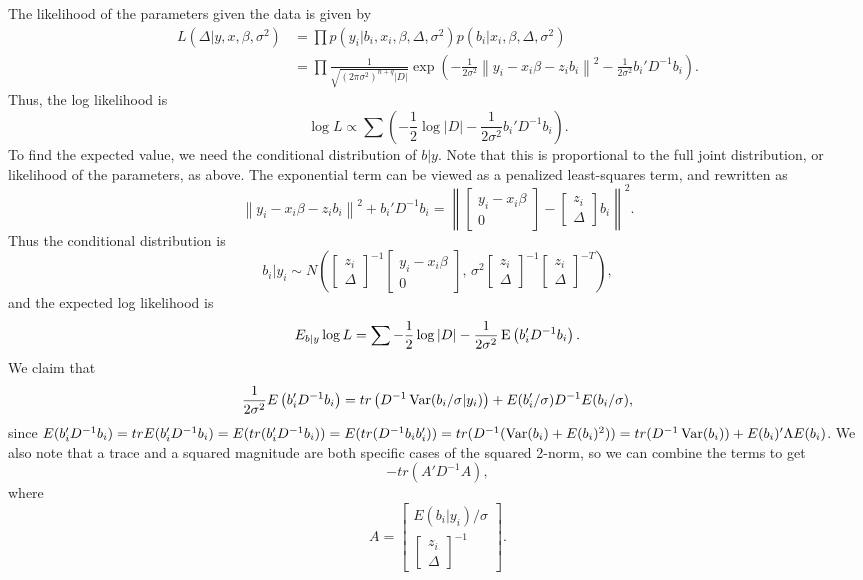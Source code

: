 \documentclass[12pt,twoside]{article}
\begin{document}
The likelihood of the parameters given the data is given by \begin{align*}
  L(\Delta| y, x, \beta, \sigma^2) &= \prod p(y_i | b_i, x_i, \beta, \Delta, \sigma^2) p(b_i | x_i, \beta, \Delta, \sigma^2) \\
  &= \prod \frac{1}{\sqrt{(2\pi \sigma^2)^{n+q} |D|}} \exp\left( -\frac{1}{2\sigma^2}\left\lVert y_i - x_i\beta - z_ib_i \right\rVert^2 -\frac{1}{2\sigma^2}b_i'D^{-1}b_i\right).
\end{align*} Thus, the log likelihood is \[
  \log L \propto \sum\left(-\frac{1}{2}\log |D| - \frac{1}{2\sigma^2}b_i'D^{-1}b_i\right).
\] To find the expected value, we need the conditional distribution of \(b | y\). Note that this is proportional to the full joint distribution, or likelihood of the parameters, as above. The exponential term can be viewed as a penalized least-squares term, and rewritten as \[
  \left\lVert y_i - x_i\beta - z_ib_i \right\rVert^2 + b_i'D^{-1}b_i = \left\lVert \begin{bmatrix} y_i - x_i\beta \\ 0 \end{bmatrix} - \begin{bmatrix} z_i \\ \Delta \end{bmatrix}b_i \right\rVert^2.
\] Thus the conditional distribution is \[
  b_i | y_i \sim N\left(\begin{bmatrix}z_i \\ \Delta \end{bmatrix}^{-1}\begin{bmatrix}y_i - x_i\beta \\ 0 \end{bmatrix}, \,\sigma^2\begin{bmatrix}z_i \\ \Delta\end{bmatrix}^{-1}\begin{bmatrix}z_i \\ \Delta\end{bmatrix}^{-T}   \right),
\] and the expected log likelihood is \[
  E_{b|y} \log L = \sum -\frac{1}2 \log |D| - \frac{1}{2\sigma^2} \operatorname{E}\left( b_i'D^{-1}b_i \right).
\] We claim that \[
  \frac{1}{2\sigma^2} E\left( b_i'D^{-1}b_i \right) = tr\left( D^{-1} \operatorname{Var}(b_i / \sigma | y_i)  \right) + E(b_i' / \sigma)D^{-1}E(b_i / \sigma),
\] since \(E(b_i'D^{-1}b_i) = trE(b_i'D^{-1}b_i) = E(tr(b_i'D^{-1} b_i)) = E(tr(D^{-1} b_ib_i')) = tr(D^{-1}(\operatorname{Var}(b_i) + E(b_i)^2)) = tr(D^{-1} \operatorname{Var}(b_i)) + E(b_i)'\Lambda E(b_i) \). We also note that a trace and a squared magnitude are both specific cases of the squared 2-norm, so we can combine the terms to get \[
  - tr(A'D^{-1}A),
\] where \[
  A = \begin{bmatrix} E(b_i | y_i) / \sigma \\ \begin{bmatrix} z_i \\ \Delta \end{bmatrix}^{-1} \end{bmatrix}.
\]
\end{document}
